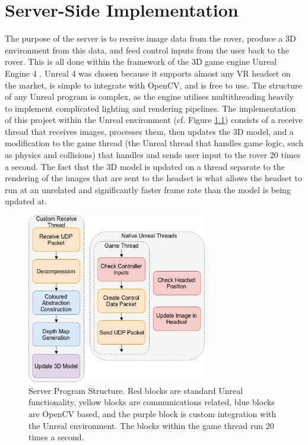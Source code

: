\chapter{Server-Side Implementation}
\label{chapter:server}

The purpose of the server is to receive image data from the rover, produce a 3D environment from this data, and feed control inputs from the user back to the rover. This is all done within the framework of the 3D game engine Unreal Engine 4 \cite{unreal}. Unreal 4 was chosen because it supports almost any VR headset on the market, is simple to integrate with OpenCV, and is free to use. The structure of any Unreal program is complex, as the engine utilises multithreading heavily to implement complicated lighting and rendering pipelines. The implementation of this project within the Unreal environment (cf. Figure \ref{fig:unreal}) consists of a receive thread that receives images, processes them, then updates the 3D model, and a modification to the game thread (the Unreal thread that handles game logic, such as physics and collisions) that handles and sends user input to the rover 20 times a second. The fact that the 3D model is updated on a thread separate to the rendering of the images that are sent to the headset is what allows the headset to run at an unrelated and significantly faster frame rate than the model is being updated at.

\begin{figure}[H]
    \begin{center}
      \includegraphics[width=0.7\textwidth]{Figures/Unreal.png}
      \caption[Server Program Structure]{Server Program Structure. Red blocks are standard Unreal functionality, yellow blocks are communications related, blue blocks are OpenCV based, and the purple block is custom integration with the Unreal environment. The blocks within the game thread run 20 times a second.}
      \label{fig:unreal}
    \end{center}
\end{figure}

